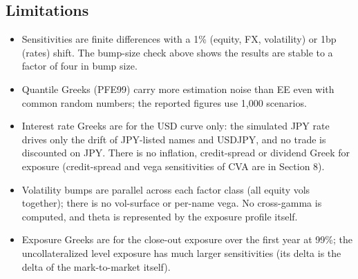 \documentclass[11pt,letterpaper]{article}
\begin{document}
\subsection{Limitations}
\begin{itemize}
\item Sensitivities are finite differences with a 1\% (equity, FX, volatility) or 1bp (rates) shift. The bump-size check above shows the results are stable to a factor of four in bump size.
\item Quantile Greeks (PFE99) carry more estimation noise than EE even with common random numbers; the reported figures use 1,000 scenarios.
\item Interest rate Greeks are for the USD curve only: the simulated JPY rate drives only the drift of JPY-listed names and USDJPY, and no trade is discounted on JPY. There is no inflation, credit-spread or dividend Greek for exposure (credit-spread and vega sensitivities of CVA are in Section 8).
\item Volatility bumps are parallel across each factor class (all equity vols together); there is no vol-surface or per-name vega. No cross-gamma is computed, and theta is represented by the exposure profile itself.
\item Exposure Greeks are for the close-out exposure over the first year at 99\%; the uncollateralized level exposure has much larger sensitivities (its delta is the delta of the mark-to-market itself).
\end{itemize}
\clearpage
\end{document}
